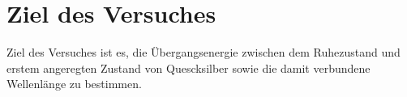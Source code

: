 \section{Ziel des Versuches}

Ziel des Versuches ist es, die Übergangsenergie zwischen dem Ruhezustand und erstem angeregten 
Zustand von Quescksilber sowie die damit verbundene Wellenlänge zu bestimmen.
